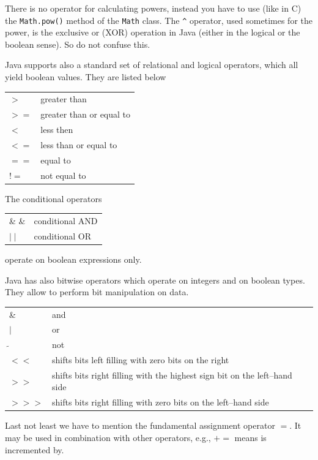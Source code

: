 There is no operator for calculating powers, instead you have to use
(like in C) the \verb|Math.pow()| method of the \verb|Math| class.
The \verb|^| operator, used sometimes for the power, is the exclusive
or (XOR) operation in Java (either in the logical or the boolean sense). 
So do not confuse this. 

Java supports also a standard set of relational and logical operators,
which all yield boolean values. They are listed below

\begin{center}
\begin{tabular}{ll}
$>$  & greater than \\
$>=$ & greater than or equal to \\
$<$  & less then \\
$<=$ & less than or equal to \\
$==$ & equal to \\
$!=$ & not equal to
\end{tabular}
\end{center}


The conditional operators
\begin{center}
\begin{tabular}{ll}
\& \& & conditional AND      \\
$\mid\mid$ & conditional OR
\end{tabular}
\end{center}
operate on  boolean expressions only.

Java has also bitwise operators which operate on integers and on
boolean types. They allow to perform bit manipulation on data.
\begin{center}
\begin{tabular}{ll}
\& & and \\
$\mid$ & or \\
$\tilde{}$ & not \\
$<<$ &  shifts bits left filling with zero bits on the right \\
$>>$ & shifts bits right filling with the highest sign bit on the
           left--hand side \\
$ >>>$ & shifts bits right filling with zero bits on the left--hand side 
\end{tabular}
\end{center}

Last not least we have to mention the fundamental assignment operator
$=$. It may be used in combination with other operators, e.g., $+=$
means is incremented by.


